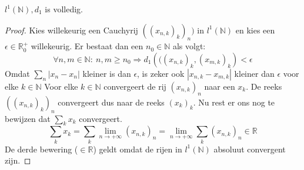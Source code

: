 \documentclass[main.tex]{subfiles}
\begin{document}
\begin{vb}
  $l^{1}(\mathbb{N}),d_{1}$ is volledig.

  \begin{proof}
    Kies willekeurig een Cauchyrij $((x_{n,k})_{k})_{n})$ in $l^{1}(\mathbb{N})$ en kies een $\epsilon\in\mathbb{R}_{0}^{+}$ willekeurig.
    Er bestaat dan een $n_{0}\in\mathbb{N}$ als volgt:
    \[ \forall n,m\in\mathbb{N}:\ n,m\ge n_{0} \Rightarrow d_{1}\left(((x_{n,k})_{k},(x_{m,k})_{k}\right) < \epsilon \]
    Omdat $\sum_{n}|x_{n}-x_{n}|$ kleiner is dan $\epsilon$, is zeker ook $|x_{n,k}-x_{m,k}|$ kleiner dan $\epsilon$ voor elke $k\in\mathbb{N}$
    Voor elke $k\in\mathbb{N}$ convergeert de rij $(x_{n,k})_{n}$ naar een $x_{k}$.
    De reeks $((x_{n,k})_{k})_{n}$ convergeert dus naar de reeks $(x_{k})_{k}$.
    Nu rest er ons nog te bewijzen dat $\sum_{k}x_{k}$ convergeert.
    \[ \sum_{k}x_{k} = \sum_{k}\lim_{n\rightarrow +\infty}(x_{n,k})_{n} = \lim_{n\rightarrow +\infty} \sum_{k}(x_{n,k})_{n} \in\mathbb{R} \]
    De derde bewering ($\in\mathbb{R}$) geldt omdat de rijen in $l^{1}(\mathbb{N})$ absoluut convergent zijn.
  \end{proof}
\end{vb}
\end{document}
